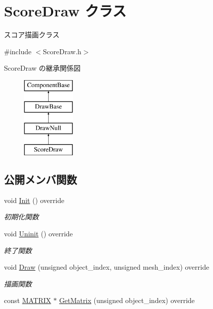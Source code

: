 \hypertarget{class_score_draw}{}\section{Score\+Draw クラス}
\label{class_score_draw}


スコア描画クラス  




{\ttfamily \#include $<$Score\+Draw.\+h$>$}

Score\+Draw の継承関係図\begin{figure}[H]
\begin{center}
\leavevmode
\includegraphics[height=4.000000cm]{class_score_draw}
\end{center}
\end{figure}
\subsection*{公開メンバ関数}
\begin{DoxyCompactItemize}
\item 
void \mbox{\hyperlink{class_score_draw_af013abb96136825e71d4fee06529fc69}{Init}} () override
\begin{DoxyCompactList}\small\item\em 初期化関数 \end{DoxyCompactList}\item 
void \mbox{\hyperlink{class_score_draw_aad744f8a7a1202e6ba8117c660f297ee}{Uninit}} () override
\begin{DoxyCompactList}\small\item\em 終了関数 \end{DoxyCompactList}\item 
void \mbox{\hyperlink{class_score_draw_a799e71943140a264cedba6002308b976}{Draw}} (unsigned object\+\_\+index, unsigned mesh\+\_\+index) override
\begin{DoxyCompactList}\small\item\em 描画関数 \end{DoxyCompactList}\item 
const \mbox{\hyperlink{_vector3_d_8h_a032295cd9fb1b711757c90667278e744}{M\+A\+T\+R\+IX}} $\ast$ \mbox{\hyperlink{class_score_draw_a62aa20ef4b40544bf0a95770b925c780}{Get\+Matrix}} (unsigned object\+\_\+index) override
\end{DoxyCompactItemize}


